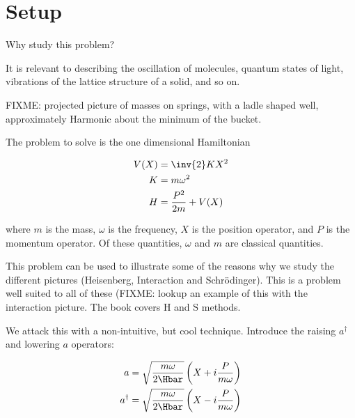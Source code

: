 %
%

\section{Setup}
Why study this problem?

It is relevant to describing the oscillation of molecules, quantum states of light, vibrations of the lattice structure of a solid, and so on.

FIXME: projected picture of masses on springs, with a ladle shaped well, approximately Harmonic about the minimum of the bucket.

The problem to solve is the one dimensional Hamiltonian

\begin{equation}\label{eqn:PHY356FLecture11:10}
\begin{aligned}
V(X) &= \inv{2} K X^2 \\
K &= m \omega^2 \\
H &= \frac{P^2}{2m} + V(X)
\end{aligned}
\end{equation}

where \(m\) is the mass, \(\omega\) is the frequency, \(X\) is the position operator, and \(P\) is the momentum operator.  Of these quantities, \(\omega\) and \(m\) are classical quantities.

This problem can be used to illustrate some of the reasons why we study the different pictures (Heisenberg, Interaction and Schr\"{o}dinger).  This is a problem well suited to all of these (FIXME: lookup an example of this with the interaction picture.  The book covers H and S methods.

We attack this with a non-intuitive, but cool technique.  Introduce the raising \(a^\dagger\) and lowering \(a\) operators:

\begin{equation}\label{eqn:PHY356FLecture11:20}
\begin{aligned}
a &= \sqrt{\frac{m \omega}{2 \Hbar}} \left( X + i \frac{P}{m\omega} \right) \\
a^\dagger &= \sqrt{\frac{m \omega}{2 \Hbar}} \left( X - i \frac{P}{m\omega} \right)
\end{aligned}
\end{equation}

